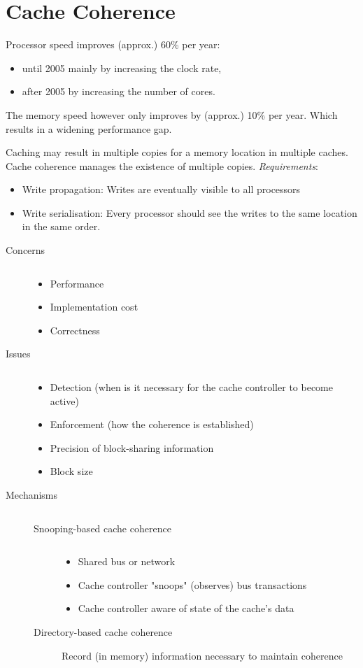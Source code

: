 \section{Cache Coherence}
Processor speed improves (approx.) 60\% per year:
\begin{itemize}
	\item until 2005 mainly by increasing the clock rate,
	\item after 2005 by increasing the number of cores.
\end{itemize}
The memory speed however only improves by (approx.) 10\% per year. Which results in a widening performance gap.
 
Caching may result in multiple copies for a memory location in multiple caches. Cache coherence manages the existence of multiple copies. 
\emph{Requirements}: 
\begin{itemize}
	\item Write propagation: Writes are eventually visible to all processors
	\item Write serialisation: Every processor should see the writes to the same location in the same order.
\end{itemize}

\begin{description}
	\item[Concerns] $\text{}$
		\begin{itemize}
			\item Performance
			\item Implementation cost
			\item Correctness
		\end{itemize}
	\item[Issues] $\text{}$
		\begin{itemize}
			\item Detection (when is it necessary for the cache controller to become active)
			\item Enforcement (how the coherence is established)
			\item Precision of block-sharing information
			\item Block size
		\end{itemize}
	\item[Mechanisms] $\text{}$
		\begin{description}
			\item[Snooping-based cache coherence] $\text{}$
				\begin{itemize}
					\item Shared bus or network
					\item Cache controller "snoops" (observes) bus transactions
					\item Cache controller aware of state of the cache's data
				\end{itemize}

			\item[Directory-based cache coherence] Record (in memory) information necessary to maintain coherence
		\end{description}

\end{description}

